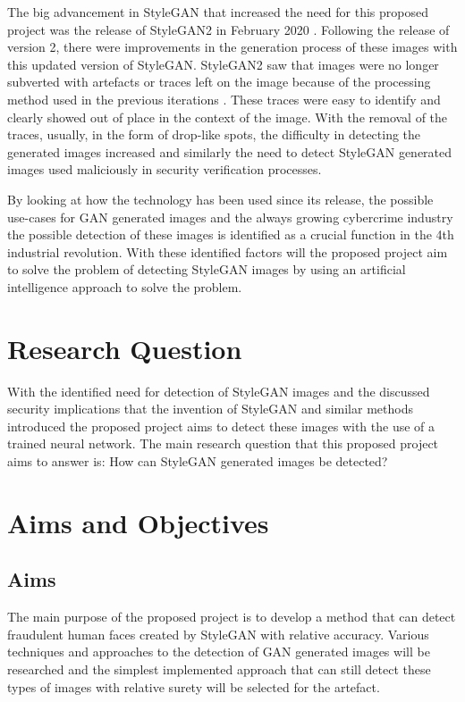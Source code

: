The big advancement in StyleGAN that increased the need for this proposed project was the release of StyleGAN2 in February 2020 \citep{Karras2020}. Following the release of version 2, there were improvements in the generation process of these images with this updated version of StyleGAN. StyleGAN2 saw that images were no longer subverted with artefacts or traces left on the image because of the processing method used in the previous iterations \citep{Karras2020}. These traces were easy to identify and clearly showed out of place in the context of the image. With the removal of the traces, usually, in the form of drop-like spots, the difficulty in detecting the generated images increased and similarly the need to detect StyleGAN generated images used maliciously in security verification processes.

By looking at how the technology has been used since its release, the possible use-cases for GAN generated images and the always growing cybercrime industry the possible detection of these images is identified as a crucial function in the 4th industrial revolution. With these identified factors will the proposed project aim to solve the problem of detecting StyleGAN images by using an artificial intelligence approach to solve the problem.

\section{Research Question}

With the identified need for detection of StyleGAN images and the discussed security implications that the invention of StyleGAN and similar methods introduced the proposed project aims to detect these images with the use of a trained neural network. The main research question that this proposed project aims to answer is: How can StyleGAN generated images be detected?

\section{Aims and Objectives}
\subsection{Aims}

The main purpose of the proposed project is to develop a method that can detect fraudulent human faces created by StyleGAN with relative accuracy. Various techniques and approaches to the detection of GAN generated images will be researched and the simplest implemented approach that can still detect these types of images with relative surety will be selected for the artefact.

